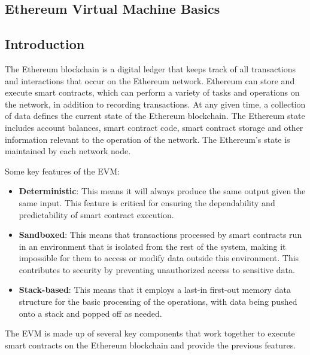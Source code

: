 \subsection{Ethereum Virtual Machine Basics}

\subsection{Introduction}

The Ethereum blockchain is a digital ledger that keeps track of all transactions and interactions that occur on the Ethereum network.
Ethereum can store and execute smart contracts, which can perform a variety of tasks and operations on the network, 
in addition to recording transactions.
At any given time, a collection of data defines the current state of the Ethereum blockchain.
The Ethereum state includes account balances, smart contract code, smart contract storage and other information relevant to the operation of the network.
The Ethereum's state is maintained by each network node.

Some key features of the EVM:

\begin{itemize}
    \item \textbf{Deterministic}: This means it will always produce the same output given the same input.
    This feature is critical for ensuring the dependability and predictability of smart contract execution. 
    \item \textbf{Sandboxed}: This means that transactions processed by smart contracts run in an 
    environment that is isolated from the rest of the system, making it impossible for them to access or modify data outside this environment.
    This contributes to security by preventing unauthorized access to sensitive data. 
    \item \textbf{Stack-based}: This means that it employs a last-in first-out memory data structure for the basic processing of the operations, 
    with data being pushed onto a stack and popped off as needed. 
\end{itemize}

The EVM is made up of several key components that work together to execute smart contracts on the Ethereum blockchain
and provide the previous features.

